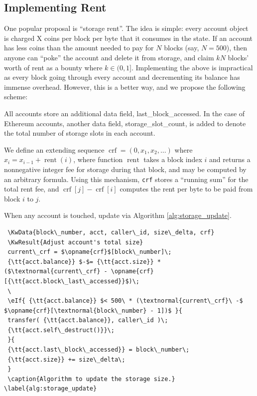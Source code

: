 \documentclass[12pt, final]{article}
\newcommand{\fname}[1]{ \operatorname{ #1 } }
\newcommand{\opname}[1]{ \operatorname{ #1 } }
\begin{document}

\subsection{Implementing Rent}


One popular proposal is ``storage rent''. The idea is simple: every account object is charged X coins per block per byte that it consumes in the state. If an account has less coins than the amount needed to pay for $N$ blocks (say, $N = 500$), then anyone can ``poke'' the account and delete it from storage, and claim $k N$ blocks' worth of rent as a bounty where $k \in (0,1]$. Implementing the above is impractical as every block going through every account and decrementing its balance has immense overhead. However, this is a better way, and we propose the following scheme:

All accounts store an additional data field, last\_block\_accessed. In the case of Ethereum accounts, another data field, storage\_slot\_count, is added to denote the total number of storage slots in each account.

We define an extending sequence $\opname{crf} = (0, x_1, x_2, \ldots )$ where $x_i = x_{i-1} + \fname{rent}(i)$, where function $\fname{rent}$ takes a block index $i$ and returns a nonnegative integer fee for storage during that block, and may be computed by an arbitrary formula. Using this mechanism, {\tt{crf}} stores a ``running sum'' for the total rent fee, and $\opname{crf}[j] - \opname{crf}[i]$ computes the rent per byte to be paid from block $i$ to $j$.

When any account is touched, update via Algorithm \ref{alg:storage_update}.



\begin{lstlisting}
 \KwData{block\_number, acct, caller\_id, size\_delta, crf}
 \KwResult{Adjust account's total size}
 current\_crf = $\opname{crf}$[block\_number]\;
 {\tt{acct.balance}} $-$= {\tt{acct.size}} * ($\textnormal{current\_crf} - \opname{crf}[{\tt{acct.block\_last\_accessed}}$)\;
 \ 
 \eIf{ {\tt{acct.balance}} $< 500\ * (\textnormal{current\_crf}\ -$ $\opname{crf}[\textnormal{block\_number} - 1])$ }{
 transfer( {\tt{acct.balance}}, caller\_id )\;
 {\tt{acct.self\_destruct()}}\;
 }{
 {\tt{acct.last\_block\_accessed}} = block\_number\;
 {\tt{acct.size}} += size\_delta\;
 }
 \caption{Algorithm to update the storage size.}
\label{alg:storage_update}
\end{lstlisting}
\end{document}
